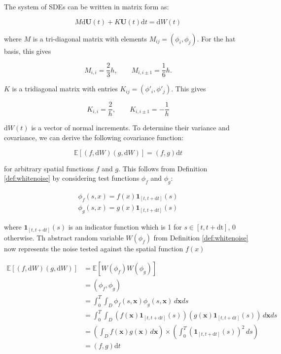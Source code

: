 The system of SDEs can be written in matrix form as:

\begin{equation}\label{eq:fe_sdes_system}
    M \mathrm{d}\mathbf{U}(t) + K \mathbf{U}(t)\mathrm{d}t = \mathrm{d}W(t)
\end{equation}

where $M$ is a tri-diagonal matrix with elements $M_{ij} = (\phi_i, \phi_j)$. 
For the hat basis, this gives

\begin{equation*}
    M_{i,i} = \frac{2}{3}h, \qquad M_{i, i\pm 1} = \frac{1}{6}h.
\end{equation*}

$K$ is a tridiagonal matrix with entries $K_{ij} =(\phi'_i, \phi'_j)$. This gives

\begin{equation*}
    K_{i,i} = \frac{2}{h}, \qquad K_{i, i\pm 1} = - \frac{1}{h}
\end{equation*}

$\mathrm{d}W(t)$ is a vector of normal increments. To determine their variance and covariance, 
we can derive the following covariance function:

\begin{equation*}
    \mathbb{E}[(f, \mathrm{d}W)(g, \mathrm{d}W)] = (f,g) \mathrm{d}t
\end{equation*}

for arbitrary spatial functions $f$ and $g$. This follows from Definition \ref{def:whitenoise}
by considering test functions $\phi_f$ and $\phi_g$:

\begin{align*}
    \phi_f(s,x) = f(x)\mathbf{1}_{[t, t+\mathrm{d}t]}(s)\\
    \phi_g(s,x) = g(x)\mathbf{1}_{[t, t+\mathrm{d}t]}(s)
\end{align*}

where $\mathbf{1}_{[t, t+\mathrm{d}t]}(s)$ is an indicator function which is 1 for
$s \in [t, t + \mathrm{dt}]$, $0$ otherwise. Th abstract random variable 
$W(\phi_f)$ from Definition \ref{def:whitenoise} now represents the noise tested 
against the spatial function $f(x)$


\begin{align*} 
    \mathbb{E}[(f, \mathrm{d}W)(g, \mathrm{d}W)] &= \mathbb{E}[W(\phi_f)W(\phi_g)] \\ 
    &= (\phi_f, \phi_g) \\ &= \int_0^T \int_D \phi_f(s, \mathbf{x}) \phi_g(s, \mathbf{x})
     \,d\mathbf{x}ds \\ &= \int_0^T \int_D \left( f(\mathbf{x}) \mathbf{1}_{[t, t+\mathrm{d}t]}(s) \right) 
     \left( g(\mathbf{x}) \mathbf{1}_{[t, t+\mathrm{d}t]}(s) \right) \,d\mathbf{x}ds \\
    &= \left( \int_D f(\mathbf{x})g(\mathbf{x})\,d\mathbf{x} \right)
     \times \left( \int_0^T (\mathbf{1}_{[t, t+\mathrm{d}t]}(s))^2 \,ds \right)  \\
    &= \left(f,g\right) \mathrm{d}t
\end{align*} 

